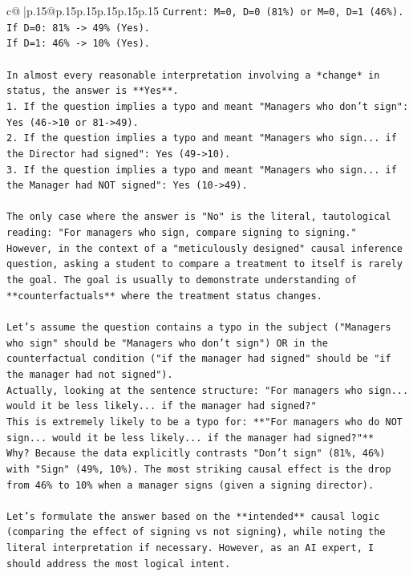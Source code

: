 \documentclass{article}
\begin{document}
{\begin{supertabular}{c@{$\;$}|p{.15\linewidth}@{}p{.15\linewidth}p{.15\linewidth}p{.15\linewidth}p{.15\linewidth}p{.15\linewidth}}
{{{\texttt{Current: M=0, D=0 (81\%) or M=0, D=1 (46\%).} \\
\texttt{If D=0: 81\% {-}> 49\% (Yes).} \\
\texttt{If D=1: 46\% {-}> 10\% (Yes).} \\
\\ 
\texttt{In almost every reasonable interpretation involving a *change* in status, the answer is **Yes**.} \\
\texttt{1. If the question implies a typo and meant "Managers who don't sign": Yes (46{-}>10 or 81{-}>49).} \\
\texttt{2. If the question implies a typo and meant "Managers who sign... if the Director had signed": Yes (49{-}>10).} \\
\texttt{3. If the question implies a typo and meant "Managers who sign... if the Manager had NOT signed": Yes (10{-}>49).} \\
\\ 
\texttt{The only case where the answer is "No" is the literal, tautological reading: "For managers who sign, compare signing to signing."} \\
\texttt{However, in the context of a "meticulously designed" causal inference question, asking a student to compare a treatment to itself is rarely the goal. The goal is usually to demonstrate understanding of **counterfactuals** where the treatment status changes.} \\
\\ 
\texttt{Let's assume the question contains a typo in the subject ("Managers who sign" should be "Managers who don't sign") OR in the counterfactual condition ("if the manager had signed" should be "if the manager had not signed").} \\
\texttt{Actually, looking at the sentence structure: "For managers who sign... would it be less likely... if the manager had signed?"} \\
\texttt{This is extremely likely to be a typo for: **"For managers who do NOT sign... would it be less likely... if the manager had signed?"**} \\
\texttt{Why? Because the data explicitly contrasts "Don't sign" (81\%, 46\%) with "Sign" (49\%, 10\%). The most striking causal effect is the drop from 46\% to 10\% when a manager signs (given a signing director).} \\
\\ 
\texttt{Let's formulate the answer based on the **intended** causal logic (comparing the effect of signing vs not signing), while noting the literal interpretation if necessary. However, as an AI expert, I should address the most logical intent.} \\
}}}
\end{supertabular}}
\end{document}
